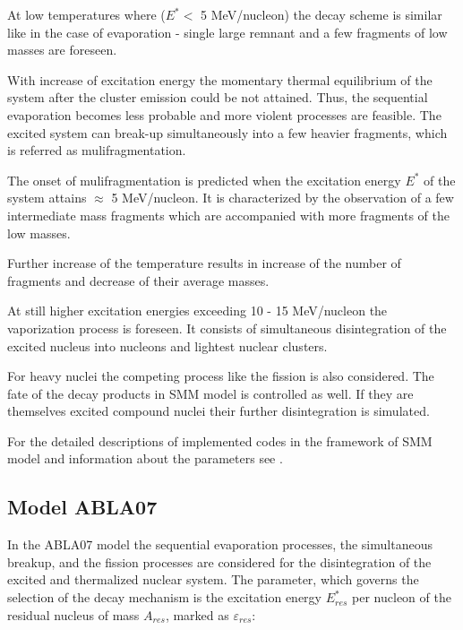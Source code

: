 At low temperatures where ($E^{*} <$ 5 MeV/nucleon) the decay scheme is similar like in the case of evaporation - single large remnant and a few fragments of low masses are foreseen.

With increase of excitation energy the momentary thermal equilibrium of the system
after the cluster emission could be not attained. Thus, the sequential evaporation becomes less probable and more violent processes are feasible.
The excited system can break-up simultaneously into a few heavier fragments, which is referred as mulifragmentation.

The onset of mulifragmentation
is predicted when the excitation energy $E^{*}$ of the system attains $\approx$ 5 MeV/nucleon.
It is characterized by the observation of a few intermediate mass fragments which are accompanied with more fragments of the low  masses.

Further increase of the temperature results in increase of the number of fragments and decrease of their average masses. 

At still higher excitation energies exceeding 10 - 15 MeV/nucleon the vaporization process is foreseen. It consists of simultaneous disintegration of the excited nucleus into nucleons and lightest nuclear clusters. 

For heavy nuclei the competing process like the fission is also considered. The fate of the decay products in SMM model 
is controlled as well. If they are themselves excited compound nuclei their further disintegration is simulated.

For the detailed descriptions of implemented codes in the framework of SMM model
and information about the parameters see 
\cite{botvina1987statistical,SMMBondorf1995,botvina2006statistical}.




\subsection{Model ABLA07}

In the ABLA07 model the sequential evaporation processes,  the simultaneous breakup, and the fission processes are considered 
for the disintegration of the excited and thermalized nuclear system. The parameter, which governs the selection of the decay mechanism is the excitation energy $E_{res}^{*}$ per nucleon of the residual nucleus of mass $A_{res}$, marked as $\varepsilon_{res}$:

